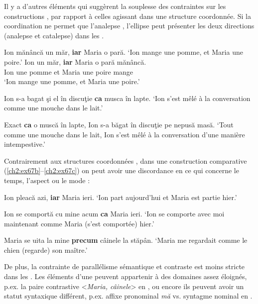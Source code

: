 Il y a d’autres éléments qui suggèrent la souplesse des contraintes sur les constructions , par rapport à celles agissant dans une structure coordonnée. Si la coordination ne permet que l’analepse , l’ellipse peut présenter les deux directions (analepse et catalepse) dans les  .

\ea \label{ch2:ex65}
\ea Ion mănâncă un măr, \textbf{iar} Maria o pară.
\glt ‘Ion mange une pomme, et Maria une poire.’  
\ex 
\gll *Ion  un  măr,  \textbf{iar}  Maria  o  pară  mănâncă.\\
Ion  une  pomme  et  Maria  une  poire  mange\\
\glt ‘Ion mange une pomme, et Maria une poire.’
\z
\z


\ea \label{ch2:ex66}
\ea Ion s-a bagat şi el în discuţie \textbf{ca} musca în lapte.
\glt  ‘Ion s’est mêlé à la conversation comme une mouche dans le lait.’  

\ex  Exact \textbf{ca} o muscă în lapte, Ion s-a băgat în discuţie pe nepusă masă.
\glt  ‘Tout comme une mouche dans le lait, Ion s’est mêlé à la conversation d’une manière intempestive.’
\z
\z

Contrairement aux structures coordonnées , dans une construction comparative (\ref{ch2:ex67b}--\ref{ch2:ex67c}) on peut avoir une discordance en ce qui concerne le temps, l’aspect ou le mode \citep{McShane2005} :

\ea
\ea *Ion pleacă azi, \textbf{iar} Maria ieri. \label{ch2:ex67a}
\glt ‘Ion part aujourd’hui et Maria est partie hier.’

\ex Ion se comportă cu mine acum \textbf{ca} Maria ieri. \label{ch2:ex67b}
\glt ‘Ion se comporte avec moi maintenant comme Maria (s’est comportée) hier.’  

\ex Maria se uita la mine \textbf{precum} câinele la stăpân. \label{ch2:ex67c}
\glt ‘Maria me regardait comme le chien (regarde) son maître.’
\z
\z

De plus, la contrainte de parallélisme sémantique et contraste est moins stricte dans les . Les éléments d’une  peuvent appartenir à des domaines assez éloignés, p.ex. la paire contrastive <\textit{Maria, câinele}> en , ou encore ils peuvent avoir un statut syntaxique différent, p.ex. affixe pronominal \textit{mă} vs. syntagme nominal en .

